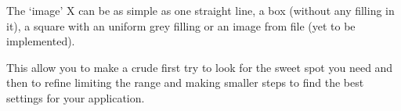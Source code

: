 The `image' X can be as simple as one straight line, a box (without any filling in it), a square
with an uniform grey filling or an image from file (yet to be implemented).

This allow you to make a crude first try to look for the sweet spot you need and then
to refine limiting the range and making smaller steps to find the best settings for your
application.

